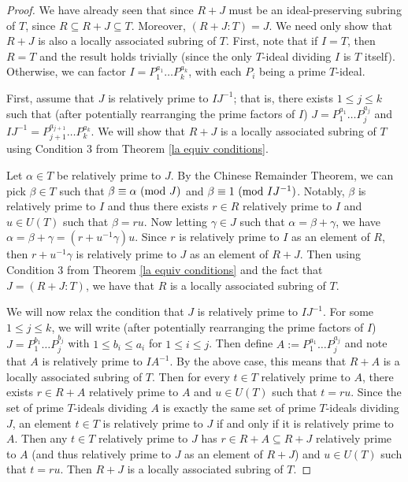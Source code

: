 \documentclass[12pt]{amsart}
\theoremstyle{definition}
\newcommand{\modulo}[1]{\textup{ (mod }#1)}
\begin{document}
	\begin{proof}
		We have already seen that since $R+J$ must be an ideal-preserving subring of $T$, since $R\subseteq R+J\subseteq T$. Moreover, $(R+J:T)=J$. We need only show that $R+J$ is also a locally associated subring of $T$. First, note that if $I=T$, then $R=T$ and the result holds trivially (since the only $T$-ideal dividing $I$ is $T$ itself). Otherwise, we can factor $I=P_1^{a_1}\dots P_k^{a_k}$, with each $P_i$ being a prime $T$-ideal.
		
		First, assume that $J$ is relatively prime to $IJ^{-1}$; that is, there exists $1\leq j\leq k$ such that (after potentially rearranging the prime factors of $I$) $J=P_1^{a_1}\dots P_j^{a_j}$ and $IJ^{-1}=P_{j+1}^{a_{j+1}}\dots P_k^{a_k}$. We will show that $R+J$ is a locally associated subring of $T$ using Condition 3 from Theorem \ref{la equiv conditions}.
		
		Let $\alpha\in T$ be relatively prime to $J$. By the Chinese Remainder Theorem, we can pick $\beta\in T$ such that $\beta\equiv \alpha\modulo{J}$ and $\beta\equiv 1\modulo{IJ^{-1}}$. Notably, $\beta$ is relatively prime to $I$ and thus there exists $r\in R$ relatively prime to $I$ and $u\in U(T)$ such that $\beta=ru$. Now letting $\gamma\in J$ such that $\alpha=\beta+\gamma$, we have $\alpha=\beta+\gamma=(r+u^{-1}\gamma)u$. Since $r$ is relatively prime to $I$ as an element of $R$, then $r+u^{-1}\gamma$ is relatively prime to $J$ as an element of $R+J$. Then using Condition 3 from Theorem \ref{la equiv conditions} and the fact that $J=(R+J:T)$, we have that $R$ is a locally associated subring of $T$.
		
		We will now relax the condition that $J$ is relatively prime to $IJ^{-1}$. For some $1\leq j\leq k$, we will write (after potentially rearranging the prime factors of $I$) $J=P_1^{b_1}\dots P_j^{b_j}$ with $1\leq b_i\leq a_i$ for $1\leq i\leq j$. Then define $A:=P_1^{a_1}\dots P_j^{a_j}$ and note that $A$ is relatively prime to $IA^{-1}$. By the above case, this means that $R+A$ is a locally associated subring of $T$. Then for every $t\in T$ relatively prime to $A$, there exists $r\in R+A$ relatively prime to $A$ and $u\in U(T)$ such that $t=ru$. Since the set of prime $T$-ideals dividing $A$ is exactly the same set of prime $T$-ideals dividing $J$, an element $t\in T$ is relatively prime to $J$ if and only if it is relatively prime to $A$. Then any $t\in T$ relatively prime to $J$ has $r\in R+A\subseteq R+J$ relatively prime to $A$ (and thus relatively prime to $J$ as an element of $R+J$) and $u\in U(T)$ such that $t=ru$. Then $R+J$ is a locally associated subring of $T$.
	\end{proof}
	
\end{document}

